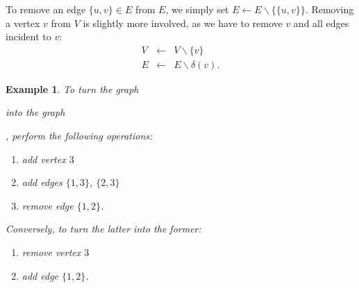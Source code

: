 \documentclass[a4paper]{book}
\theoremstyle{changebreak}                %
\newtheorem{eg}[result]{Example}
\begin{document}
To remove an edge $\{u,v\}\in E$ from $E$, we simply set $E\leftarrow
E\smallsetminus\{\{u,v\}\}$. Removing a vertex $v$ from $V$ is
slightly more involved, as we have to remove $v$ and all edges
incident to $v$:
\begin{eqnarray*}
  V &\leftarrow& V\smallsetminus \{v\} \\
  E &\leftarrow& E\smallsetminus \delta(v).
\end{eqnarray*}

\begin{eg}
\vspace*{1em}
To turn the graph 
\begin{minipage}{1.5cm}
\end{minipage}
into the graph
\begin{minipage}{2.5cm}
\end{minipage},
perform the following operations:
\begin{enumerate}
\item add vertex $3$
\item add edges $\{1,3\}$, $\{2,3\}$
\item remove edge $\{1,2\}$.
\end{enumerate}
Conversely, to turn the latter into the former:
\begin{enumerate}
\item remove vertex $3$
\item add edge $\{1,2\}$.
\end{enumerate}
\end{eg}
\end{document}
